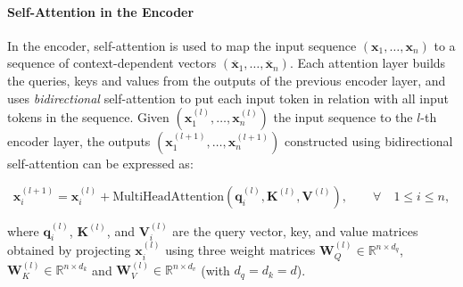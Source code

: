 


\paragraph{Self-Attention in the Encoder} In the encoder, self-attention is used to map the input sequence $(\bm{x}_1, \ldots, \bm{x}_n)$ to a sequence of context-dependent vectors $(\overline{\bm{x}}_1, \ldots, \overline{\bm{x}}_n)$. Each attention layer builds the queries, keys and values from the outputs of the previous encoder layer, and uses \textit{bidirectional} self-attention to put each input token in relation with all input tokens in the sequence. Given $(\bm{x}^{(l)}_1, \ldots, \bm{x}^{(l)}_n)$ the input sequence to the $l$-th encoder layer, the outputs $(\bm{x}^{(l+1)}_1, \ldots, \bm{x}^{(l+1)}_n)$ constructed using bidirectional self-attention can be expressed as:

\begin{equation}
    \bm{x}^{(l+1)}_i = \bm{x}^{(l)}_i + \textrm{MultiHeadAttention}\left(\bm{q}^{(l)}_i, \bm{K}^{(l)}, \bm{V}^{(l)}\right), \qquad \forall \quad 1 \leq i \leq n,
\end{equation}

\noindent where $\bm{q}^{(l)}_i$, $\bm{K}^{(l)}$, and $\bm{V}^{(l)}_i$ are the query vector, key, and value matrices obtained by projecting $\bm{x}^{(l)}_i$ using three weight matrices $\bm{W}^{(l)}_Q \in \mathbb{R}^{n \times d_q}$, $\bm{W}^{(l)}_K \in \mathbb{R}^{n \times d_k}$ and $\bm{W}^{(l)}_V \in \mathbb{R}^{n \times d_v}$ (with $d_q = d_k = d$).

